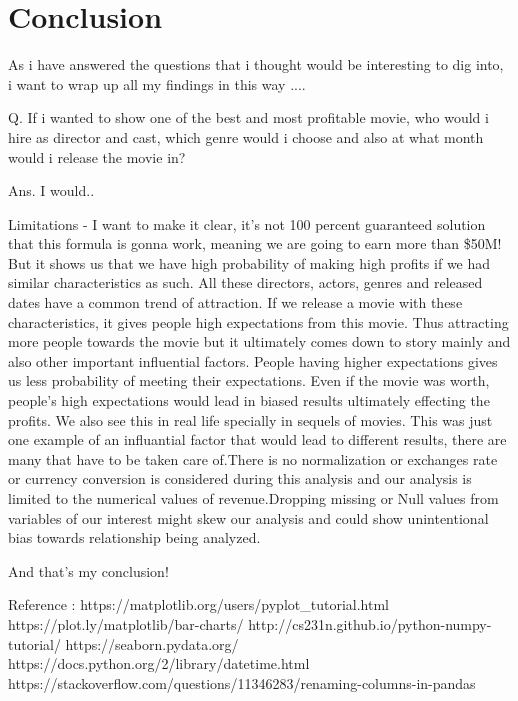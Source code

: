 \documentclass[11pt]{article}
\begin{document}
    \section{Conclusion}\label{conclusion}

As i have answered the questions that i thought would be interesting to
dig into, i want to wrap up all my findings in this way ....

Q. If i wanted to show one of the best and most profitable movie, who
would i hire as director and cast, which genre would i choose and also
at what month would i release the movie in?

Ans. I would..

Limitations - I want to make it clear, it's not 100 percent guaranteed
solution that this formula is gonna work, meaning we are going to earn
more than \$50M! But it shows us that we have high probability of making
high profits if we had similar characteristics as such. All these
directors, actors, genres and released dates have a common trend of
attraction. If we release a movie with these characteristics, it gives
people high expectations from this movie. Thus attracting more people
towards the movie but it ultimately comes down to story mainly and also
other important influential factors. People having higher expectations
gives us less probability of meeting their expectations. Even if the
movie was worth, people's high expectations would lead in biased results
ultimately effecting the profits. We also see this in real life
specially in sequels of movies. This was just one example of an
influantial factor that would lead to different results, there are many
that have to be taken care of.There is no normalization or exchanges
rate or currency conversion is considered during this analysis and our
analysis is limited to the numerical values of revenue.Dropping missing
or Null values from variables of our interest might skew our analysis
and could show unintentional bias towards relationship being analyzed.

And that's my conclusion!

    Reference : https://matplotlib.org/users/pyplot\_tutorial.html
https://plot.ly/matplotlib/bar-charts/
http://cs231n.github.io/python-numpy-tutorial/
https://seaborn.pydata.org/
https://docs.python.org/2/library/datetime.html
https://stackoverflow.com/questions/11346283/renaming-columns-in-pandas


    
    
    
    
\end{document}
